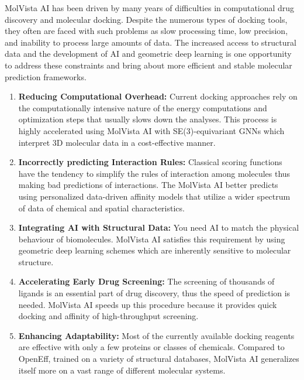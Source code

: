 \documentclass[12pt,a4]{report}
\begin{document}
\hspace{0.3in}MolVista AI has been driven by many years of difficulties in computational drug discovery and molecular docking. Despite the numerous types of docking tools, they often are faced with such problems as slow processing time, low precision, and inability to process large amounts of data. The increased access to structural data and the development of AI and geometric deep learning is one opportunity to address these constraints and bring about more efficient and stable molecular prediction frameworks.\\

\begin{enumerate}
    \item \textbf{Reducing Computational Overhead:} Current docking approaches rely on the computationally intensive nature of the energy computations and optimization steps that usually slows down the analyses. This process is highly accelerated using MolVista AI with SE(3)-equivariant GNNs which interpret 3D molecular data in a cost-effective manner.\\

    \item \textbf{Incorrectly predicting Interaction Rules:} Classical scoring functions have the tendency to simplify the rules of interaction among molecules thus making bad predictions of interactions. The MolVista AI better predicts using personalized data-driven affinity models that utilize a wider spectrum of data of chemical and spatial characteristics.\\

    \item \textbf{Integrating AI with Structural Data:} You need AI to match the physical behaviour of biomolecules. MolVista AI satisfies this requirement by using geometric deep learning schemes which are inherently sensitive to molecular structure.\\

    \item \textbf{Accelerating Early Drug Screening:} The screening of thousands of ligands is an essential part of drug discovery, thus the speed of prediction is needed. MolVista AI speeds up this procedure because it provides quick docking and affinity of high-throughput screening.\\

    \item \textbf{Enhancing Adaptability:} Most of the currently available docking reagents are effective with only a few proteins or classes of chemicals. Compared to OpenEff, trained on a variety of structural databases, MolVista AI generalizes itself more on a vast range of different molecular systems.\\


\end{enumerate}
\end{document}
